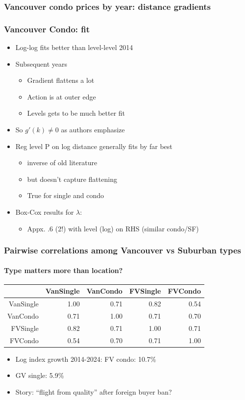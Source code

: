 \documentclass{beamer}
\begin{document}
\begin{frame}
	\frametitle{Vancouver condo prices by year: distance gradients}
\end{frame}

\begin{frame}
	\frametitle{Vancouver Condo: fit}
	\begin{itemize}
		\item Log-log fits better than level-level 2014
		\item Subsequent years 
			\begin{itemize}
				\item Gradient flattens a lot
				\item Action is at outer edge
				\item Levels gets to be much better fit
			\end{itemize}
		\item So $g'(k)\neq 0$ as authors emphasize
		\item Reg level P on log distance generally fits by far best
			\begin{itemize}
				\item inverse of old literature
				\item but doesn't capture flattening
				\item True for single and condo
			\end{itemize}
		\item Box-Cox results for $\lambda$:
			\begin{itemize}
				\item Appx. .6 (2!) with level (log) on RHS (similar condo/SF)
			\end{itemize}
	\end{itemize}
\end{frame}

\begin{frame}
	\frametitle{Pairwise correlations among Vancouver vs Suburban types}
	\framesubtitle{Type matters more than location?}
	\begin{tabular}{rrrrr}
  \hline
 & VanSingle & VanCondo & FVSingle & FVCondo \\
  \hline
VanSingle & 1.00 & 0.71 & 0.82 & 0.54 \\
  VanCondo & 0.71 & 1.00 & 0.71 & 0.70 \\
  FVSingle & 0.82 & 0.71 & 1.00 & 0.71 \\
  FVCondo & 0.54 & 0.70 & 0.71 & 1.00 \\
   \hline
\end{tabular}
\begin{itemize}
	\item Log index growth 2014-2024: FV condo: 10.7\% 	
	\item GV single: 5.9\%
	\item Story: ``flight from quality'' after foreign buyer ban?
\end{itemize}

\end{frame}
\end{document}
